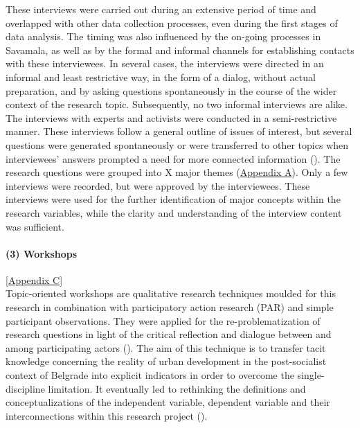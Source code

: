 \documentclass[11pt]{report}
\begin{document}
{{{{These interviews were carried out during an extensive period of time and overlapped with other data collection processes, even during the first stages of data analysis. The timing was also influenced by the on-going processes in Savamala, as well as by the formal and informal channels for establishing  contacts with these interviewees. In several cases, the interviews were directed in an informal and least restrictive way, in the form of a dialog, without actual preparation, and by  asking questions spontaneously in the course of the wider context of the research topic. Subsequently, no two informal interviews are alike. The interviews with experts and activists were conducted in a semi-restrictive manner. These interviews follow a general outline of issues of interest, but several questions were generated spontaneously or were transferred to other topics when interviewees’ answers prompted a need for more connected information (\href{ref}{\citealt{payne_key_2004}}). The research questions were grouped into X major themes (\href{Appendix}{Appendix A}). Only a few interviews were recorded, but were approved by the interviewees. These interviews were used for the further identification of major concepts within the research variables, while the clarity and understanding of the interview content was sufficient. 

\paragraph{(3) Workshops} 
[\href{ref}{Appendix C}]
\\
Topic-oriented workshops are qualitative research techniques moulded for this research in combination with participatory action research (PAR) and simple participant observations. They were applied for the re-problematization of research questions in light of the critical reflection and dialogue between and among participating actors (\href{Mc}{\citealt{mcintyre_participatory_2008}}). The aim of this technique is to transfer tacit knowledge concerning the reality of urban development in the post-socialist context of Belgrade into explicit indicators in order to overcome the single- discipline limitation. It eventually led to rethinking the definitions and conceptualizations of the independent variable, dependent variable and their interconnections within this research project (\href{Whyte}{\citealt{whyte_participatory_1991}}). 
\\

}}}}
\end{document}
